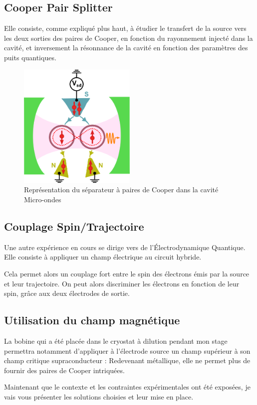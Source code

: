 \subsection{Cooper Pair Splitter}
Elle consiste, comme expliqué plus haut, à étudier le transfert de la source vers les deux sorties des paires de Cooper, en fonction du rayonnement injecté dans la cavité, et inversement la résonnance de la cavité en fonction des paramètres des puits quantiques.

\begin{figure}[h]
    \begin{center}
        \includegraphics[width=0.50\textwidth]{Images/Exp/Cavity}
        \caption{Représentation du séparateur à paires de Cooper dans la cavité Micro-ondes}
        \label{expe_separateur_dans_cavite}
    \end{center}
\end{figure}

\subsection{Couplage Spin/Trajectoire}
Une autre expérience en cours se dirige vers de l'Électrodynamique Quantique. Elle consiste à appliquer un champ électrique au circuit hybride.

Cela permet alors un couplage fort entre le spin des électrons émis par la source et leur trajectoire. On peut alors discriminer les électrons en fonction de leur spin, grâce aux deux électrodes de sortie.

\subsection{Utilisation du champ magnétique}

La bobine qui a été placée dans le cryostat à dilution pendant mon stage permettra notamment d'appliquer à l'électrode source un champ supérieur à son champ critique supraconducteur : Redevenant métallique, elle ne permet plus de fournir des paires de Cooper intriquées.
\bigskip

\bigskip


Maintenant que le contexte et les contraintes expérimentales ont été exposées, je vais vous présenter les solutions choisies et leur mise en place.
